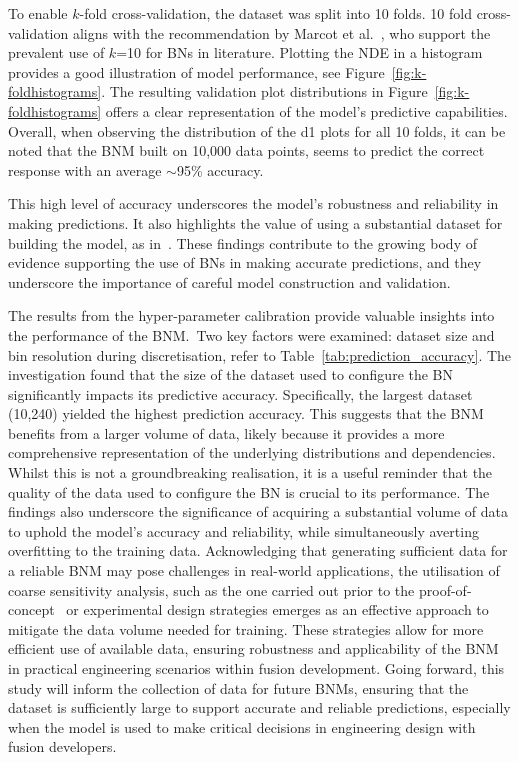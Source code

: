 \documentclass[journal]{IEEEtran}
\begin{document}
To enable $k$-fold cross-validation, the dataset was split into 10 folds. 10 fold cross-validation aligns with the recommendation by Marcot et al.~\cite{Marcot2021}, who support the prevalent use of $k$=10 for BNs in literature. Plotting the NDE in a histogram provides a good illustration of model performance, see Figure~\ref{fig:k-foldhistograms}. The resulting validation plot distributions in Figure~\ref{fig:k-foldhistograms} offers a clear representation of the model's predictive capabilities. Overall, when observing the distribution of the d1 plots for all 10 folds, it can be noted that the BNM built on 10,000 data points, seems to predict the correct response with an average $\sim$95\% accuracy.

This high level of accuracy underscores the model's robustness and reliability in making predictions. It also highlights the value of using a substantial dataset for building the model, as in~\cite{Griffiths2024}. These findings contribute to the growing body of evidence supporting the use of BNs in making accurate predictions, and they underscore the importance of careful model construction and validation.

The results from the hyper-parameter calibration provide valuable insights into the performance of the BNM.~Two key factors were examined: dataset size and bin resolution during discretisation, refer to Table~\ref{tab:prediction_accuracy}. The investigation found that the size of the dataset used to configure the BN significantly impacts its predictive accuracy. Specifically, the largest dataset (10,240) yielded the highest prediction accuracy. This suggests that the BNM benefits from a larger volume of data, likely because it provides a more comprehensive representation of the underlying distributions and dependencies. Whilst this is not a groundbreaking realisation, it is a useful reminder that the quality of the data used to configure the BN is crucial to its performance. The findings also underscore the significance of acquiring a substantial volume of data to uphold the model's accuracy and reliability, while simultaneously averting overfitting to the training data. Acknowledging that generating sufficient data for a reliable BNM may pose challenges in real-world applications, the utilisation of coarse sensitivity analysis, such as the one carried out prior to the proof-of-concept~\cite{Griffiths2024,Hidalgo-Salaverri2023} or experimental design strategies emerges as an effective approach to mitigate the data volume needed for training. These strategies allow for more efficient use of available data, ensuring robustness and applicability of the BNM in practical engineering scenarios within fusion development. Going forward, this study will inform the collection of data for future BNMs, ensuring that the dataset is sufficiently large to support accurate and reliable predictions, especially when the model is used to make critical decisions in engineering design with fusion developers.
\end{document}
